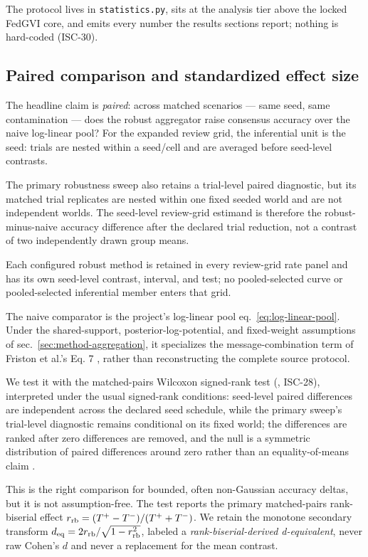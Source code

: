 \documentclass[
  english,
]{article}
\theoremstyle{plain}
\theoremstyle{definition}
\theoremstyle{remark}
\theoremstyle{definition}
\begin{document}
The protocol lives in \texttt{statistics.py}, sits at the analysis tier
above the locked FedGVI core, and emits every number the results
sections report; nothing is hard-coded (ISC-30).

\subsection{Paired comparison and standardized effect
size}\label{sec:methods-paired}

The headline claim is \emph{paired}: across matched scenarios --- same
seed, same contamination --- does the robust aggregator raise consensus
accuracy over the naive log-linear pool? For the expanded review grid,
the inferential unit is the seed: trials are nested within a seed/cell
and are averaged before seed-level contrasts.

The primary robustness sweep also retains a trial-level paired
diagnostic, but its matched trial replicates are nested within one fixed
seeded world and are not independent worlds. The seed-level review-grid
estimand is therefore the robust-minus-naive accuracy difference after
the declared trial reduction, not a contrast of two independently drawn
group means.

Each configured robust method is retained in every review-grid rate
panel and has its own seed-level contrast, interval, and test; no
pooled-selected curve or pooled-selected inferential member enters that
grid.

The naive comparator is the project's log-linear pool
eq.~\ref{eq:log-linear-pool}. Under the shared-support,
posterior-log-potential, and fixed-weight assumptions of
sec.~\ref{sec:method-aggregation}, it specializes the
message-combination term of Friston et al.'s Eq. 7
\citeyearpar{friston2024federated}, rather than reconstructing the
complete source protocol.

We test it with the matched-pairs Wilcoxon signed-rank test
\citep{wilcoxon1945individual} (,
ISC-28), interpreted under the usual signed-rank conditions: seed-level
paired differences are independent across the declared seed schedule,
while the primary sweep's trial-level diagnostic remains conditional on
its fixed world; the differences are ranked after zero differences are
removed, and the null is a symmetric distribution of paired differences
around zero rather than an equality-of-means claim
\citep{fay2010wilcoxon}.

This is the right comparison for bounded, often non-Gaussian accuracy
deltas, but it is not assumption-free. The test reports the primary
matched-pairs rank-biserial effect
\(r_{\rm rb} = (T^{+} - T^{-})/(T^{+} + T^{-})\). We retain the monotone
secondary transform \(d_{\rm eq}=2r_{\rm rb}/\sqrt{1-r_{\rm rb}^2}\),
labeled a \emph{rank-biserial-derived d-equivalent}, never raw Cohen's
\(d\) and never a replacement for the mean contrast.
\end{document}

